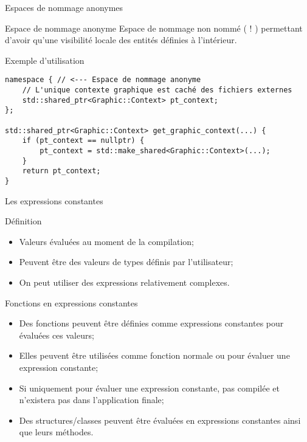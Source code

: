 \documentclass[handout,10pt]{beamer}
\newcommand{\includepartcode}[4][cpp]{

}
\begin{document}
\begin{frame}[fragile]{Espaces de nommage anonymes}
\tiny
\begin{block}{Espace de nommage anonyme}
Espace de nommage non nommé ( ! ) permettant d'avoir qu'une visibilité locale des entités définies à l'intérieur.
\end{block}

\begin{exampleblock}{Exemple d'utilisation}
\begin{lstlisting}
namespace { // <--- Espace de nommage anonyme
    // L'unique contexte graphique est caché des fichiers externes
    std::shared_ptr<Graphic::Context> pt_context;
};

std::shared_ptr<Graphic::Context> get_graphic_context(...) {
    if (pt_context == nullptr) {
        pt_context = std::make_shared<Graphic::Context>(...);
    }
    return pt_context;
}

\end{lstlisting}
\end{exampleblock}
\end{frame}

\begin{frame}[fragile]{Les expressions constantes}
\tiny
\begin{block}{Définition}
\begin{itemize}
\item Valeurs évaluées au moment de la compilation;
\item Peuvent être des valeurs de types définis par l'utilisateur;
\item On peut utiliser des expressions relativement complexes.
\end{itemize}
\includepartcode{constexpr.cpp}{31}{33}
\end{block}

\begin{block}{Fonctions en expressions constantes}
\begin{itemize}
\item Des fonctions peuvent être définies comme expressions constantes pour évaluées ces valeurs;
\item Elles peuvent être utilisées comme fonction normale ou pour évaluer une expression constante;
\item Si uniquement pour évaluer une expression constante, pas compilée et n'existera pas dans l'application finale;
\item Des structures/classes peuvent être évaluées en expressions constantes ainsi que leurs méthodes.
\end{itemize}
\includepartcode{constexpr.cpp}{4}{11}
\includepartcode{constexpr.cpp}{34}{34}
\end{block}
\end{frame}
\end{document}
